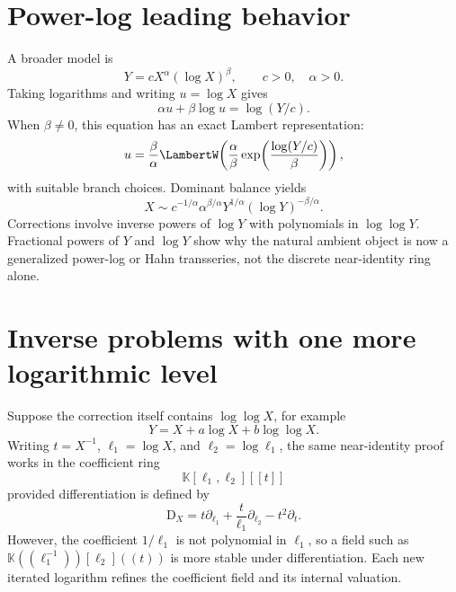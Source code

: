 \documentclass[11pt,oneside,openany]{book}
\newcommand{\K}{\mathbb{K}}
\newcommand{\D}{\mathrm{D}}
\begin{document}
\section{Power-log leading behavior}
A broader model is
\begin{equation}\label{eq:powerlogleading}
 Y=cX^\alpha(\log X)^\beta,
 \qquad c>0,
 \quad \alpha>0.
\end{equation}
Taking logarithms and writing \(u=\log X\) gives
\begin{equation}\label{eq:powerloglogeq}
 \alpha u+\beta\log u=\log(Y/c).
\end{equation}
When \(\beta\neq0\), this equation has an exact Lambert representation:
\begin{equation}\label{eq:powerlogexactu}
 u=\frac{\beta}{\alpha}
 \LambertW\!\left(
   \frac{\alpha}{\beta}
   \exp\!\left(\frac{\log(Y/c)}{\beta}\right)
 \right),
\end{equation}
with suitable branch choices.  Dominant balance yields
\begin{equation}\label{eq:powerloginverseleading}
 X\sim
 c^{-1/\alpha}\alpha^{\beta/\alpha}
 Y^{1/\alpha}(\log Y)^{-\beta/\alpha}.
\end{equation}
Corrections involve inverse powers of \(\log Y\) with polynomials in
\(\log\log Y\).  Fractional powers of \(Y\) and \(\log Y\) show why the
natural ambient object is now a generalized power-log or Hahn transseries,
not the discrete near-identity ring alone.

\section{Inverse problems with one more logarithmic level}
Suppose the correction itself contains \(\log\log X\), for example
\begin{equation}\label{eq:doublelogmap}
 Y=X+a\log X+b\log\log X.
\end{equation}
Writing \(t=X^{-1}\), \(\ell_1=\log X\), and
\(\ell_2=\log\ell_1\), the same near-identity proof works in the coefficient
ring
\begin{equation}\label{eq:twologring}
 \K[\ell_1,\ell_2][[t]]
\end{equation}
provided differentiation is defined by
\begin{equation}\label{eq:twologderivative}
 \D_X
 =t\partial_{\ell_1}
  +\frac{t}{\ell_1}\partial_{\ell_2}
  -t^2\partial_t.
\end{equation}
However, the coefficient \(1/\ell_1\) is not polynomial in \(\ell_1\), so a
field such as
\(\K((\ell_1^{-1}))[\ell_2]((t))\) is more stable under differentiation.  Each
new iterated logarithm refines the coefficient field and its internal
valuation.
\end{document}
